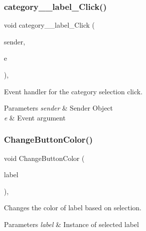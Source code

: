 \subsubsection{\texorpdfstring{category\+\_\+\+\_\+label\+\_\+\+Click()}{category\_\_label\_Click()}}
{\footnotesize\ttfamily void category\+\_\+\+\_\+label\+\_\+\+Click (\begin{DoxyParamCaption}\item[{object}]{sender,  }\item[{Event\+Args}]{e }\end{DoxyParamCaption})\hspace{0.3cm}{\ttfamily [inline]}, {\ttfamily [private]}}



Event handler for the category selection click. 


\begin{DoxyParams}{Parameters}
{\em sender} & Sender Object\\
\hline
{\em e} & Event argument\\
\hline
\end{DoxyParams}
\mbox{\label{classWildlifeTrackingApp_1_1MainPage_a219fa14b69b49c53c056f1246586ee7c}} 
\subsubsection{\texorpdfstring{Change\+Button\+Color()}{ChangeButtonColor()}}
{\footnotesize\ttfamily void Change\+Button\+Color (\begin{DoxyParamCaption}\item[{Label}]{label }\end{DoxyParamCaption})\hspace{0.3cm}{\ttfamily [inline]}, {\ttfamily [private]}}



Changes the color of label based on selection. 


\begin{DoxyParams}{Parameters}
{\em label} & Instance of selected label\\
\hline
\end{DoxyParams}
\mbox{\label{classWildlifeTrackingApp_1_1MainPage_a849c3c7f8d08104f0cdb46bee9fe6389}} 
